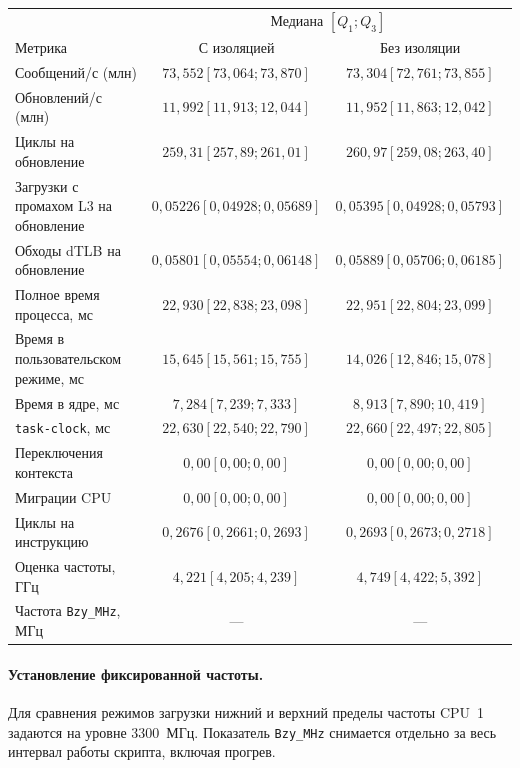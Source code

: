 \documentclass[a4paper,12pt]{article}
\begin{document}
\begin{center}
\small
\setlength{\tabcolsep}{3pt}
\begin{tabular}{lcc}
\toprule
& \multicolumn{2}{c}{Медиана \([Q_1; Q_3]\)} \\
Метрика & С изоляцией & Без изоляции \\
\midrule
Сообщений/с (млн) & $73,552 [73,064; 73,870]$ & $73{,}304 [72{,}761; 73{,}855]$ \\
Обновлений/с (млн) & $11,992 [11,913; 12,044]$ & $11{,}952 [11{,}863; 12{,}042]$ \\
Циклы на обновление & $259,31 [257,89; 261,01]$ & $260{,}97 [259{,}08; 263{,}40]$ \\
Загрузки с промахом L3 на обновление & $0,05226 [0,04928; 0,05689]$ & $0{,}05395 [0{,}04928; 0{,}05793]$ \\
Обходы dTLB на обновление & $0,05801 [0,05554; 0,06148]$ & $0{,}05889 [0{,}05706; 0{,}06185]$ \\
Полное время процесса, мс & $22,930 [22,838; 23,098]$ & $22{,}951 [22{,}804; 23{,}099]$ \\
Время в пользовательском режиме, мс & $15,645 [15,561; 15,755]$ & $14{,}026 [12{,}846; 15{,}078]$ \\
Время в ядре, мс & $7,284 [7,239; 7,333]$ & $8{,}913 [7{,}890; 10{,}419]$ \\
\texttt{task-clock}, мс & $22,630 [22,540; 22,790]$ & $22{,}660 [22{,}497; 22{,}805]$ \\
Переключения контекста & $0,00 [0,00; 0,00]$ & $0{,}00 [0{,}00; 0{,}00]$ \\
Миграции CPU & $0,00 [0,00; 0,00]$ & $0{,}00 [0{,}00; 0{,}00]$ \\
Циклы на инструкцию & $0,2676 [0,2661; 0,2693]$ & $0{,}2693 [0{,}2673; 0{,}2718]$ \\
Оценка частоты, ГГц & $4,221 [4,205; 4,239]$ & $4{,}749 [4{,}422; 5{,}392]$ \\
Частота \texttt{Bzy\_MHz}, МГц & --- & --- \\
\bottomrule
\end{tabular}
\end{center}



\paragraph{Установление фиксированной частоты.}
Для сравнения режимов загрузки нижний и верхний пределы частоты CPU~1
задаются на уровне 3300~МГц. Показатель \texttt{Bzy\_MHz}
снимается отдельно за весь интервал работы скрипта, включая прогрев.
\end{document}
